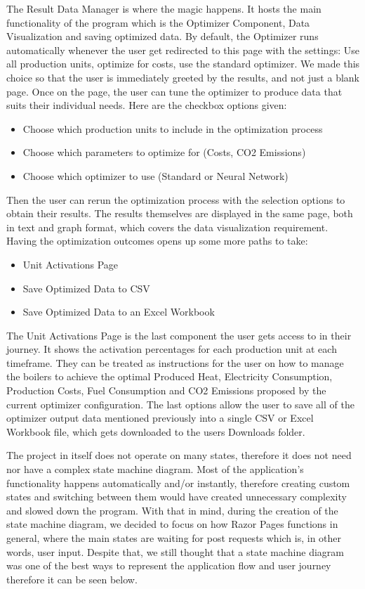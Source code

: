 \documentclass[12pt]{report}
\begin{document}
The Result Data Manager is where the magic happens. It hosts the main functionality of the program which is the Optimizer Component, Data Visualization and saving optimized data.
By default, the Optimizer runs automatically whenever the user get redirected to this page with the settings: Use all production units,
optimize for costs, use the standard optimizer. We made this choice so that the user is immediately greeted by the results, and not just a blank page.
Once on the page, the user can tune the optimizer to produce data that suits their individual needs. Here are the checkbox options given:
\begin{itemize}
  \item Choose which production units to include in the optimization process
  \item Choose which parameters to optimize for (Costs, CO2 Emissions)
  \item Choose which optimizer to use (Standard or Neural Network)
\end{itemize}
Then the user can rerun the optimization process with the selection options to obtain their results. The results themselves are displayed in the same page,
both in text and graph format, which covers the data visualization requirement. Having the optimization outcomes opens up some more paths to take:
\begin{itemize}
  \item Unit Activations Page
  \item Save Optimized Data to CSV
  \item Save Optimized Data to an Excel Workbook
\end{itemize}
The Unit Activations Page is the last component the user gets access to in their journey. It shows the activation percentages for each production unit at each timeframe.
They can be treated as instructions for the user on how to manage the boilers to achieve the optimal Produced Heat, Electricity Consumption, Production Costs, 
Fuel Consumption and CO2 Emissions proposed by the current optimizer configuration.
The last options allow the user to save all of the optimizer output data mentioned previously into a single CSV or Excel Workbook file, which gets
downloaded to the users Downloads folder.


The project in itself does not operate on many states, therefore it does not need nor have a complex state machine diagram.
Most of the application's functionality happens automatically and/or instantly, therefore creating custom states and switching between them
would have created unnecessary complexity and slowed down the program. With that in mind, during the creation of the state machine diagram,
we decided to focus on how Razor Pages functions in general, where the main states are waiting for post requests which is, in other words, user input.
Despite that, we still thought that a state machine diagram was one of the best ways to represent the application flow and user journey
therefore it can be seen below. 
\end{document}
